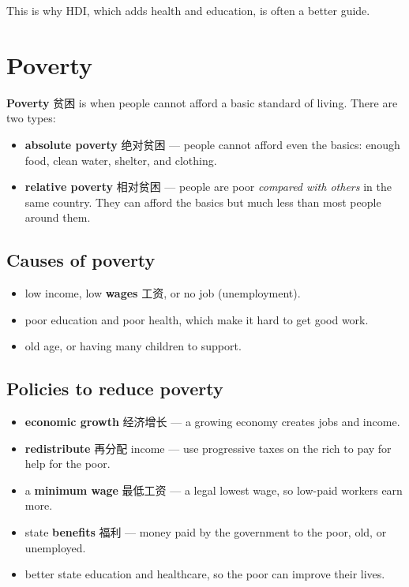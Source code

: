 \documentclass[11pt]{article}
\begin{document}
This is why HDI, which adds health and education, is often a better guide.

\section*{Poverty}

\textbf{Poverty} 贫困 is when people cannot afford a basic standard of living. There are two types:

\begin{itemize}
\item \textbf{absolute poverty} 绝对贫困 — people cannot afford even the basics: enough food, clean water, shelter, and clothing.

\item \textbf{relative poverty} 相对贫困 — people are poor \emph{compared with others} in the same country. They can afford the basics but much less than most people around them.

\end{itemize}

\subsection*{Causes of poverty}

\begin{itemize}
\item low income, low \textbf{wages} 工资, or no job (unemployment).

\item poor education and poor health, which make it hard to get good work.

\item old age, or having many children to support.

\end{itemize}

\subsection*{Policies to reduce poverty}

\begin{itemize}
\item \textbf{economic growth} 经济增长 — a growing economy creates jobs and income.

\item \textbf{redistribute} 再分配 income — use progressive taxes on the rich to pay for help for the poor.

\item a \textbf{minimum wage} 最低工资 — a legal lowest wage, so low-paid workers earn more.

\item state \textbf{benefits} 福利 — money paid by the government to the poor, old, or unemployed.

\item better state education and healthcare, so the poor can improve their lives.

\end{itemize}
\end{document}
